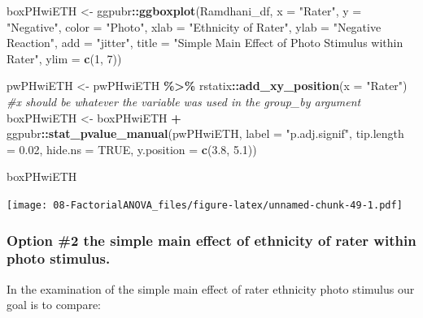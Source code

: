 \documentclass[
  11pt,
]{book}
\newenvironment{Shaded}{\begin{snugshade}}{\end{snugshade}}
\newcommand{\AttributeTok}[1]{\textcolor[rgb]{0.27,0.27,0.27}{#1}}
\newcommand{\CommentTok}[1]{\textcolor[rgb]{0.37,0.37,0.37}{\textit{#1}}}
\newcommand{\ConstantTok}[1]{\textcolor[rgb]{0.37,0.37,0.37}{#1}}
\newcommand{\DecValTok}[1]{\textcolor[rgb]{0.06,0.06,0.06}{#1}}
\newcommand{\FloatTok}[1]{\textcolor[rgb]{0.06,0.06,0.06}{#1}}
\newcommand{\FunctionTok}[1]{\textcolor[rgb]{0.27,0.27,0.27}{\textbf{#1}}}
\newcommand{\NormalTok}[1]{#1}
\newcommand{\OtherTok}[1]{\textcolor[rgb]{0.37,0.37,0.37}{#1}}
\newcommand{\SpecialCharTok}[1]{\textcolor[rgb]{0.43,0.43,0.43}{\textbf{#1}}}
\newcommand{\StringTok}[1]{\textcolor[rgb]{0.5,0.5,0.5}{#1}}
\begin{document}
\begin{Shaded}
\begin{Highlighting}[]
\NormalTok{boxPHwiETH }\OtherTok{\textless{}{-}}\NormalTok{ ggpubr}\SpecialCharTok{::}\FunctionTok{ggboxplot}\NormalTok{(Ramdhani\_df, }\AttributeTok{x =} \StringTok{"Rater"}\NormalTok{, }\AttributeTok{y =} \StringTok{"Negative"}\NormalTok{,}
    \AttributeTok{color =} \StringTok{"Photo"}\NormalTok{, }\AttributeTok{xlab =} \StringTok{"Ethnicity of Rater"}\NormalTok{, }\AttributeTok{ylab =} \StringTok{"Negative Reaction"}\NormalTok{,}
    \AttributeTok{add =} \StringTok{"jitter"}\NormalTok{, }\AttributeTok{title =} \StringTok{"Simple Main Effect of Photo Stimulus within Rater"}\NormalTok{,}
    \AttributeTok{ylim =} \FunctionTok{c}\NormalTok{(}\DecValTok{1}\NormalTok{, }\DecValTok{7}\NormalTok{))}

\NormalTok{pwPHwiETH }\OtherTok{\textless{}{-}}\NormalTok{ pwPHwiETH }\SpecialCharTok{\%\textgreater{}\%}
\NormalTok{    rstatix}\SpecialCharTok{::}\FunctionTok{add\_xy\_position}\NormalTok{(}\AttributeTok{x =} \StringTok{"Rater"}\NormalTok{)  }\CommentTok{\#x should be whatever the variable was used in the group\_by argument }
\NormalTok{boxPHwiETH }\OtherTok{\textless{}{-}}\NormalTok{ boxPHwiETH }\SpecialCharTok{+}\NormalTok{ ggpubr}\SpecialCharTok{::}\FunctionTok{stat\_pvalue\_manual}\NormalTok{(pwPHwiETH, }\AttributeTok{label =} \StringTok{"p.adj.signif"}\NormalTok{,}
    \AttributeTok{tip.length =} \FloatTok{0.02}\NormalTok{, }\AttributeTok{hide.ns =} \ConstantTok{TRUE}\NormalTok{, }\AttributeTok{y.position =} \FunctionTok{c}\NormalTok{(}\FloatTok{3.8}\NormalTok{, }\FloatTok{5.1}\NormalTok{))}

\NormalTok{boxPHwiETH}
\end{Highlighting}
\end{Shaded}

\texttt{[image: 08-FactorialANOVA\_files/figure-latex/unnamed-chunk-49-1.pdf]}

\hypertarget{option-2-the-simple-main-effect-of-ethnicity-of-rater-within-photo-stimulus.}{%
\subsubsection{Option \#2 the simple main effect of ethnicity of rater within photo stimulus.}\label{option-2-the-simple-main-effect-of-ethnicity-of-rater-within-photo-stimulus.}}

In the examination of the simple main effect of rater ethnicity photo stimulus our goal is to compare:
\end{document}
